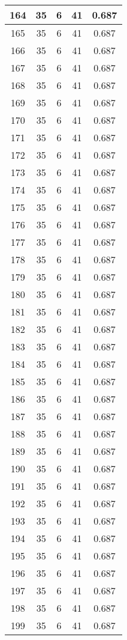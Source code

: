 \documentclass[letterpaper, 12pt]{article}
\begin{document}
\begin{longtable}{|c|c|c|c|c|}
\hline
164 & 35 & 6 & 41 & 0.687 \\
\hline
165 & 35 & 6 & 41 & 0.687 \\
\hline
166 & 35 & 6 & 41 & 0.687 \\
\hline
167 & 35 & 6 & 41 & 0.687 \\
\hline
168 & 35 & 6 & 41 & 0.687 \\
\hline
169 & 35 & 6 & 41 & 0.687 \\
\hline
170 & 35 & 6 & 41 & 0.687 \\
\hline
171 & 35 & 6 & 41 & 0.687 \\
\hline
172 & 35 & 6 & 41 & 0.687 \\
\hline
173 & 35 & 6 & 41 & 0.687 \\
\hline
174 & 35 & 6 & 41 & 0.687 \\
\hline
175 & 35 & 6 & 41 & 0.687 \\
\hline
176 & 35 & 6 & 41 & 0.687 \\
\hline
177 & 35 & 6 & 41 & 0.687 \\
\hline
178 & 35 & 6 & 41 & 0.687 \\
\hline
179 & 35 & 6 & 41 & 0.687 \\
\hline
180 & 35 & 6 & 41 & 0.687 \\
\hline
181 & 35 & 6 & 41 & 0.687 \\
\hline
182 & 35 & 6 & 41 & 0.687 \\
\hline
183 & 35 & 6 & 41 & 0.687 \\
\hline
184 & 35 & 6 & 41 & 0.687 \\
\hline
185 & 35 & 6 & 41 & 0.687 \\
\hline
186 & 35 & 6 & 41 & 0.687 \\
\hline
187 & 35 & 6 & 41 & 0.687 \\
\hline
188 & 35 & 6 & 41 & 0.687 \\
\hline
189 & 35 & 6 & 41 & 0.687 \\
\hline
190 & 35 & 6 & 41 & 0.687 \\
\hline
191 & 35 & 6 & 41 & 0.687 \\
\hline
192 & 35 & 6 & 41 & 0.687 \\
\hline
193 & 35 & 6 & 41 & 0.687 \\
\hline
194 & 35 & 6 & 41 & 0.687 \\
\hline
195 & 35 & 6 & 41 & 0.687 \\
\hline
196 & 35 & 6 & 41 & 0.687 \\
\hline
197 & 35 & 6 & 41 & 0.687 \\
\hline
198 & 35 & 6 & 41 & 0.687 \\
\hline
199 & 35 & 6 & 41 & 0.687 \\
\hline
\end{longtable}
\end{document}
